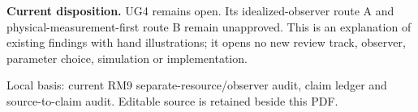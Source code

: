 \documentclass[11pt]{article}
\begin{document}
\textbf{Current disposition.} UG4 remains open. Its idealized-observer route A
and physical-measurement-first route B remain unapproved. This is an explanation
of existing findings with hand illustrations; it opens no new review track,
observer, parameter choice, simulation or implementation.

\small Local basis: current RM9 separate-resource/observer audit,
claim ledger and source-to-claim audit.
Editable source is retained beside this PDF.
\end{document}
